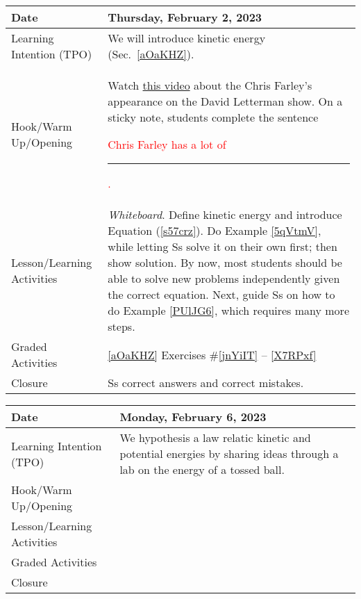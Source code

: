 \documentclass[main.tex]{subfiles}
\begin{document}
\begin{tabular}{|m{}|m{}|}
    \hline
    \cellcolor{black!20}\textbf{Date} &
    \cellcolor{black!20}\textbf{Thursday, February 2, 2023} \\
    \hline
    Learning Intention (TPO) & We will introduce \gls{kinetic energy} (Sec.~\ref{aOaKHZ}). \\
    \hline
    Hook/Warm Up/Opening & Watch \href{https://youtu.be/_z9kdqDwA80}{this video} about the Chris Farley's appearance on the David Letterman show. On a sticky note, students complete the sentence \textcolor{red}{Chris Farley has a lot of \rule{2cm}{0.15mm}.}\\
    \hline
    Lesson/Learning Activities & \textit{Whiteboard}. Define \gls{kinetic energy} and introduce Equation (\ref{s57crz}). Do Example \ref{5qVtmV}, while letting Ss solve it on their own first; then show solution. By now, most students should be able to solve new problems independently given the correct equation. Next, guide Ss on how to do Example \ref{PUlJG6}, which requires many more steps.\\
    \hline
    Graded Activities & \ref{aOaKHZ} Exercises \#\ref{jnYiIT} -- \ref{X7RPxf}\\
    \hline
    Closure & Ss correct answers and correct mistakes.\\
    \hline
    \hline
\end{tabular}  

\begin{tabular}{|m{}|m{}|}
    \hline  
    \cellcolor{black!20}\textbf{Date} &
    \cellcolor{black!20}\textbf{Monday, February 6, 2023} \\
    \hline
    Learning Intention (TPO) & We hypothesis a law relatic kinetic and potential energies by sharing ideas through a lab on the energy of a tossed ball.\\
    \hline
    Hook/Warm Up/Opening & \\
    \hline
    Lesson/Learning Activities & \\
    \hline
    Graded Activities & \\
    \hline
    Closure & \\  
    \hline
\end{tabular} 
\end{document}
